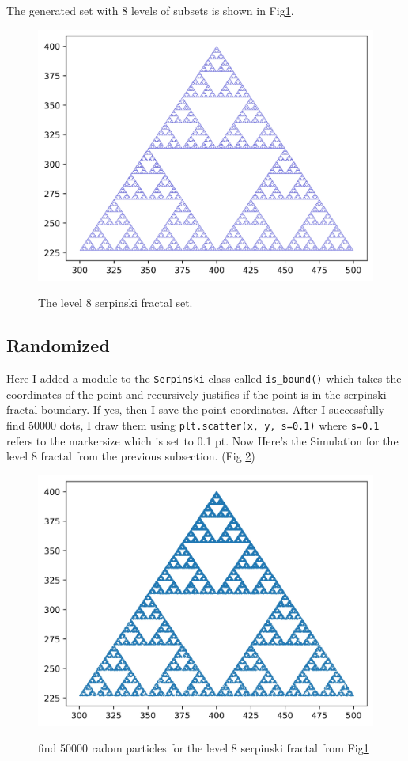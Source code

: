 \documentclass[12pt]{article}
\begin{document}
		The generated set with 8 levels of subsets is shown in Fig\ref{fig:serpDet}.
		\begin{figure}[h!]
			\centering
			\includegraphics[width=.9\linewidth]{../P2/fractalstuff.jpg}
			\label{fig:serpDet}
			\caption{The level 8 serpinski fractal set.}
		\end{figure}
		\subsection{Randomized}
		Here I added a module to the \texttt{Serpinski} class called \texttt{is\_bound()} which takes
		the coordinates of the point and recursively justifies if the point is in the serpinski fractal
		boundary. If yes, then I save the point coordinates. After I successfully find 50000 dots, I 
		draw them using \texttt{plt.scatter(x, y, s=0.1)} where \texttt{s=0.1} refers to the markersize
		which is set to 0.1 pt. Now Here's the Simulation for the level 8 fractal from the previous
		subsection. (Fig \ref{fig:serpRAND})
		\begin{figure}[h!]
			\centering
			\includegraphics[width=0.9\linewidth]{../P3/fractalstuff.jpg}
			\label{fig:serpRAND}
			\caption{find 50000 radom particles for the level 8 serpinski fractal from 
				Fig\ref{fig:serpDet}}
		\end{figure}
\end{document}
